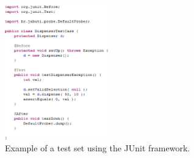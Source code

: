 
\begin{figure}[!ht]
\begin{center}
\includegraphics[width=0.4\textwidth]{fig/junit-test-case.eps}
\caption{\label{fig:junit}Example of a test set using the JUnit
framework.}
\end{center}
\end{figure}
